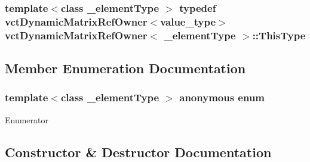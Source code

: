 \subsubsection[{This\+Type}]{\setlength{\rightskip}{0pt plus 5cm}template$<$class \+\_\+element\+Type $>$ typedef {\bf vct\+Dynamic\+Matrix\+Ref\+Owner}$<$value\+\_\+type$>$ {\bf vct\+Dynamic\+Matrix\+Ref\+Owner}$<$ \+\_\+element\+Type $>$\+::{\bf This\+Type}}\label{classvct_dynamic_matrix_ref_owner_a004c89da7faff7d573988fc3b9ec43d9}


\subsection{Member Enumeration Documentation}
\hypertarget{classvct_dynamic_matrix_ref_owner_af13d59ea37e2deaafd66ed04d22db916}{}\subsubsection[{anonymous enum}]{\setlength{\rightskip}{0pt plus 5cm}template$<$class \+\_\+element\+Type $>$ anonymous enum}\label{classvct_dynamic_matrix_ref_owner_af13d59ea37e2deaafd66ed04d22db916}
\begin{Desc}
\item[Enumerator]\par
\begin{description}
\item[{\em 
\hypertarget{classvct_dynamic_matrix_ref_owner_af13d59ea37e2deaafd66ed04d22db916ae19d71a7e9eb96879fbbe0b8acea6fae}{}D\+I\+M\+E\+N\+S\+I\+O\+N\label{classvct_dynamic_matrix_ref_owner_af13d59ea37e2deaafd66ed04d22db916ae19d71a7e9eb96879fbbe0b8acea6fae}
}]\end{description}
\end{Desc}


\subsection{Constructor \& Destructor Documentation}
\hypertarget{classvct_dynamic_matrix_ref_owner_a72f01614f9be39f058c620d408210e41}{}
